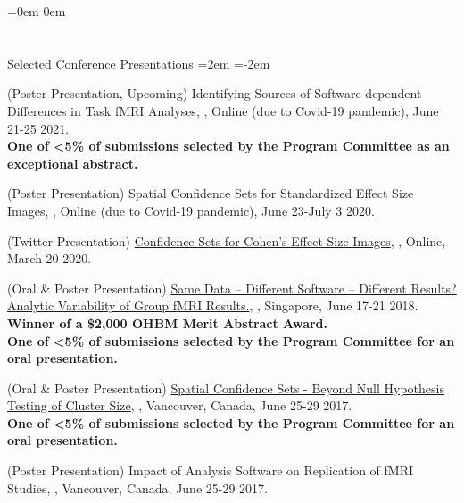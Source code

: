 \documentclass{my_cv}
\begin{document}
\leftskip=0em
\parindent 0em

\section{\faBarChart}{Selected Conference Presentations}
\leftskip=2em
\parindent=-2em

\hspace{-2em}(Poster Presentation, Upcoming) Identifying Sources of Software-dependent Differences in Task fMRI Analyses, , Online (due to Covid-19 pandemic), June 21-25 2021.\\
\textbf{One of <5\% of submissions selected by the Program Committee as an exceptional abstract. }

(Poster Presentation) Spatial Confidence Sets for Standardized Effect Size Images, , Online (due to Covid-19 pandemic), June 23-July 3 2020. 

(Twitter Presentation) \href{https://twitter.com/OHBMequinoX/status/1240926466302500864}{Confidence Sets for Cohen’s  Effect Size Images}, , Online, March 20 2020. 

(Oral \& Poster Presentation) \href{https://www.pathlms.com/ohbm/courses/8246/sections/12541/video_presentations/116000}{Same Data – Different Software – Different Results? Analytic Variability of Group fMRI Results.}, , Singapore, June 17-21 2018. \\
\textbf{Winner of a \$2,000 OHBM Merit Abstract Award.} \\
\textbf{One of <5\% of submissions selected by the Program Committee for an oral presentation. }

(Oral \& Poster Presentation) \href{https://www.pathlms.com/ohbm/courses/5158/sections/7816/video_presentations/78445}{Spatial Confidence Sets - Beyond Null Hypothesis Testing of Cluster Size}, , Vancouver, Canada, June 25-29 2017. \\
\textbf{One of <5\% of submissions selected by the Program Committee for an oral presentation. }

(Poster Presentation) Impact of Analysis Software on Replication of fMRI Studies, , Vancouver, Canada, June 25-29 2017.
\end{document}
